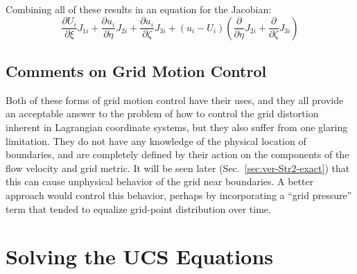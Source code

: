 Combining all of these results in an equation for the Jacobian:
\begin{equation}
\label{eq:jacobian-preserving}
\frac{{\partial {U_i}}}{{\partial \xi }}{J_{1i}} + \frac{{\partial {u_i}}}{{\partial \eta }}{J_{2i}} + \frac{{\partial {u_i}}}{{\partial \zeta }}{J_{3i}} + \left( {{u_i} - {U_i}} \right)\left( {\frac{\partial }{{\partial \eta }}{J_{2i}} + \frac{\partial }{{\partial \zeta }}{J_{3i}}} \right)
\end{equation}

\subsection{Comments on Grid Motion Control}
Both of these forms of grid motion control have their uses, and they all provide an acceptable answer to the problem of how to control the grid distortion inherent in Lagrangian coordinate systems, but they also suffer from one glaring limitation. They do not have any knowledge of the physical location of boundaries, and are completely defined by their action on the components of the flow velocity and grid metric. It will be seen later (Sec.~\ref{sec:ver-Str2-exact}) that this can cause unphysical behavior of the grid near boundaries. A better approach would control this behavior, perhaps by incorporating a ``grid pressure'' term that tended to equalize grid-point distribution over time.

\section{Solving the UCS Equations}
\label{sec:UCS-Godunov}

